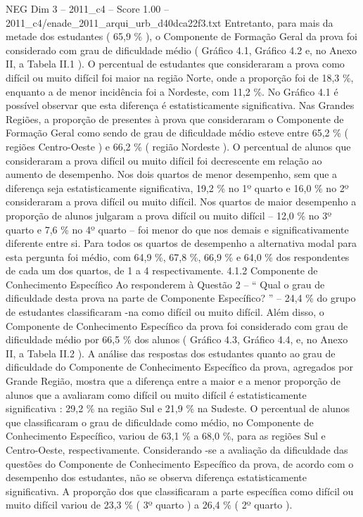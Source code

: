 \begin{textsample}{NEG Dim 3 – 2011\_c4 – Score 1.00 – 2011\_c4/enade\_2011\_arqui\_urb\_d40dca22f3.txt}
Entretanto, para mais da metade dos estudantes ( 65,9 \% ), o Componente de Formação Geral da prova foi considerado com grau de dificuldade médio ( Gráfico 4.1, Gráfico 4.2 e, no Anexo II, a Tabela II.1 ).
O percentual de estudantes que consideraram a prova como difícil ou muito difícil foi maior na região Norte, onde a proporção foi de 18,3 \%, enquanto a de menor incidência foi a Nordeste, com 11,2 \%.
No Gráfico 4.1 é possível observar que esta diferença é estatisticamente significativa.
Nas Grandes Regiões, a proporção de presentes à prova que consideraram o Componente de Formação Geral como sendo de grau de dificuldade médio esteve entre 65,2 \% ( regiões Centro-Oeste ) e 66,2 \% ( região Nordeste ).
O percentual de alunos que consideraram a prova difícil ou muito difícil foi decrescente em relação ao aumento de desempenho.
Nos dois quartos de menor desempenho, sem que a diferença seja estatisticamente significativa, 19,2 \% no 1º quarto e 16,0 \% no 2º consideraram a prova difícil ou muito difícil.
Nos quartos de maior desempenho a proporção de alunos julgaram a prova difícil ou muito difícil – 12,0 \% no 3º quarto e 7,6 \% no 4º quarto – foi menor do que nos demais e significativamente diferente entre si.
Para todos os quartos de desempenho a alternativa modal para esta pergunta foi médio, com 64,9 \%, 67,8 \%, 66,9 \% e 64,0 \% dos respondentes de cada um dos quartos, de 1 a 4 respectivamente. 4.1.2 Componente de Conhecimento Específico Ao responderem à Questão 2 – “ Qual o grau de dificuldade desta prova na parte de Componente Específico? ” – 24,4 \% do grupo de estudantes classificaram -na como difícil ou muito difícil.
Além disso, o Componente de Conhecimento Específico da prova foi considerado com grau de dificuldade médio por 66,5 \% dos alunos ( Gráfico 4.3, Gráfico 4.4, e, no Anexo II, a Tabela II.2 ).
A análise das respostas dos estudantes quanto ao grau de dificuldade do Componente de Conhecimento Específico da prova, agregados por Grande Região, mostra que a diferença entre a maior e a menor proporção de alunos que a avaliaram como difícil ou muito difícil é estatisticamente significativa : 29,2 \% na região Sul e 21,9 \% na Sudeste.
O percentual de alunos que classificaram o grau de dificuldade como médio, no Componente de Conhecimento Específico, variou de 63,1 \% a 68,0 \%, para as regiões Sul e Centro-Oeste, respectivamente.
Considerando -se a avaliação da dificuldade das questões do Componente de Conhecimento Específico da prova, de acordo com o desempenho dos estudantes, não se observa diferença estatisticamente significativa.
A proporção dos que classificaram a parte específica como difícil ou muito difícil variou de 23,3 \% ( 3º quarto ) a 26,4 \% ( 2º quarto ).

\end{textsample}
